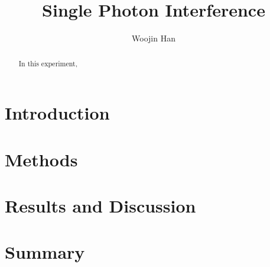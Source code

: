 \documentclass{article}
\begin{document}
\title{Single Photon Interference}
\author[1]{Woojin Han}
\maketitle

\begin{abstract}
    In this experiment,

\end{abstract}
\section{Introduction}



\section{Methods}

\section{Results and Discussion}

\section{Summary}



\cite{abcd}


\end{document}
